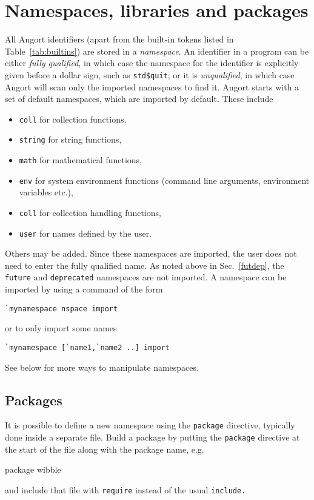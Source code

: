 \section{Namespaces, libraries and packages}
\label{namespaces}
\def\dollarsign{\$}\indw{\dollarsign}
All Angort identifiers (apart from the built-in tokens listed in Table~\ref{tab:builtins})
are stored in a \emph{namespace}. An identifier in a program
can be either \emph{fully qualified},
in which case the namespace for the identifier is explicitly given before
a dollar sign, such as \verb+std$quit+; or it is \emph{unqualified}, in
which case Angort will scan only the imported namespaces to find it.
Angort starts with a set of default namespaces, which are imported
by default. These include
\begin{itemize}
\item \texttt{coll} for collection functions,
\item \texttt{string} for string functions,
\item \texttt{math} for mathematical functions,
\item \texttt{env} for system environment functions (command line arguments,
environment variables etc.),
\item \texttt{coll} for collection handling functions,
\item \texttt{user} for names defined by the user.
\end{itemize}
Others may be added. Since these namespaces are imported, the user
does not need to enter the fully qualified name. As noted above in Sec.~\ref{futdep},
the \texttt{future} and \texttt{deprecated} namespaces are not imported.
A namespace can be imported by using a command of the form
\begin{lstlisting}
`mynamespace nspace import
\end{lstlisting}
or to only import some names
\begin{lstlisting}
`mynamespace [`name1,`name2 ..] import
\end{lstlisting}
See below for more ways to manipulate namespaces.


\subsection{Packages}
\label{packages}
It is possible to define a new namespace using the \texttt{package}
directive, typically done inside a separate file.
Build a package by putting the \texttt{package} directive at the start
of the file along with the package name, e.g.
\begin{v}
package wibble
\end{v}
and include that file with \texttt{require} instead of the usual \texttt{include.} 

